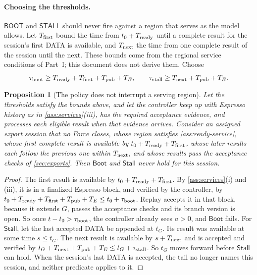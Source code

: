 \documentclass[11pt,a4paper]{article}
\newcommand{\tagg}[1]{\ensuremath{\mathsf{#1}}}
\newtheorem{proposition}[proposition]{Proposition}
\begin{document}
\paragraph{Choosing the thresholds.}
\tagg{BOOT} and \tagg{STALL} should never fire against a region that
serves as the model allows. Let $T_{\rm first}$ bound the time from
$t_0+T_{\rm ready}$ until a complete result for the session's first DATA
is available, and $T_{\rm next}$ the time from one complete result of
the session until the next. These bounds come from the regional service
conditions of Part~I; this document does not derive them. Choose
\[
 \tau_{\rm boot}\ge T_{\rm ready}+T_{\rm first}+T_{\rm pub}+T_E,
 \qquad
 \tau_{\rm stall}\ge T_{\rm next}+T_{\rm pub}+T_E.
\]

\begin{proposition}[The policy does not interrupt a serving region]
\label{prop:policy-noninterference}
Let the thresholds satisfy the bounds above, and let the controller keep
up with Espresso history as in \cref{ass:services}(iii), has the
required acceptance evidence, and processes each eligible result when
that evidence arrives. Consider an assigned export session that no
Force closes, whose region satisfies
\cref{ass:ready-service}, whose first complete result is available by
$t_0+T_{\rm ready}+T_{\rm first}$, whose later results each follow the
previous one within $T_{\rm next}$, and whose results pass the
acceptance checks of \cref{sec:exports}. Then $\tagg{Boot}$ and
$\tagg{Stall}$ never hold for this session.
\end{proposition}
\begin{proof}
The first result is available by $t_0+T_{\rm ready}+T_{\rm first}$. By
\cref{ass:services}(i) and (iii), it is in a finalized Espresso block,
and verified by the controller, by
$t_0+T_{\rm ready}+T_{\rm first}+T_{\rm pub}+T_E\le
t_0+\tau_{\rm boot}$. Replay accepts it in that block, because
it extends $G$, passes the acceptance checks and its branch version is
open. So once $t-t_0>\tau_{\rm boot}$, the controller already
sees $a>0$, and $\tagg{Boot}$ fails. For $\tagg{Stall}$, let the last
accepted DATA be appended at $t_G$. Its result was available at some
time $s\le t_G$. The next result is available by $s+T_{\rm next}$ and is
accepted and verified by $t_G+T_{\rm next}+T_{\rm pub}+T_E\le
t_G+\tau_{\rm stall}$. So $t_G$ moves forward before $\tagg{Stall}$ can
hold. When the session's last DATA is accepted, the tail no longer names
this session, and neither predicate applies to it.
\end{proof}
\end{document}
